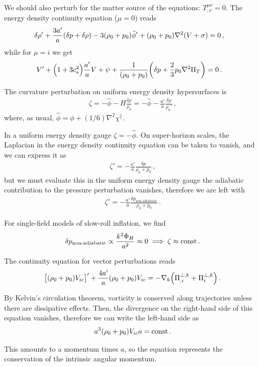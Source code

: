 \documentclass[main.tex]{subfiles}
\begin{document}
We should also perturb for the matter source of the equations: \(T^{\mu \nu }_{; \nu } =0 \). 
The energy density continuity equation (\(\mu = 0\)) reads 
%
\begin{align}
\delta \rho ' + \frac{3 a'}{a} \qty(\delta p + \delta \rho ) - 3 \qty(\rho_0 + p_0 )  \hat{\phi}' + \qty(\rho_0 + p_0 ) \nabla^2 \qty(V + \sigma ) &= 0
\,,
\end{align}
%
while for \(\mu = i\) we get 
%
\begin{align}
V' + \qty(1 + 3 c_s^2) \frac{a'}{a} V + \psi + \frac{1}{(\rho_0 + p_0 )} \qty(\delta p + \frac{2}{3} p_0 \nabla^2 \Pi _T) &= 0
\,.
\end{align}

The curvature perturbation on uniform energy density hypersurfaces is 
%
\begin{align}
\zeta = - \hat{\phi} - H \frac{ \delta \rho }{\rho_0 } = - \hat{\phi} - \frac{a'}{a} \frac{ \delta \rho }{\rho_0 '}
\,,
\end{align}
%
where, as usual, \(\hat{\phi} = \phi + (1/6) \nabla^2 \chi^{\parallel}\). 

In a uniform energy density gauge \(\zeta = - \hat{\phi}\). 
On super-horizon scales, the Laplacian in the energy density continuity equation can be taken to vanish, and we can express it as 
%
\begin{align}
\zeta ' = - \frac{a'}{a} \frac{ \delta p}{\rho_0 + p_0 }
\,,
\end{align}
%
but we must evaluate this in the uniform energy density gauge the adiabatic contribution to the pressure perturbation vanishes, therefore we are left with 
%
\begin{align}
\zeta ' = - \frac{a'}{a} \frac{ \delta p _{\text{non-adiabatic}}}{\rho_0 + p_0 }
\,.
\end{align}

For single-field models of slow-roll inflation, we find 
%
\begin{align}
\delta p _{\text{non-adiabatic}} \propto \frac{k^2 \Phi _H}{a^2} \approx 0 \implies \zeta \approx \text{const} 
\,.
\end{align}

The continuity equation for vector perturbations reads 
%
\begin{align}
\qty[(\rho_0 +p_0 ) V_{ic}]' + \frac{4 a'}{a} (\rho_0 + p_0 ) V_{ic} 
= - \nabla_k \qty(\Pi^{\perp, k}_{, i} + \Pi^{\perp, k}_{i})
\,.
\end{align}

By Kelvin's circulation theorem, vorticity is conserved along trajectories unless there are dissipative effects.
Then, the divergence on the right-hand side of this equation vanishes, therefore we can write the left-hand side as 
%
\begin{align}
a^3 \qty(\rho_0 + p_0 ) V_{ic} a = \text{const}
\,.
\end{align}

This amounts to a momentum times \(a\), so the equation represents the conservation of the intrinsic angular momentum. 
\end{document}

